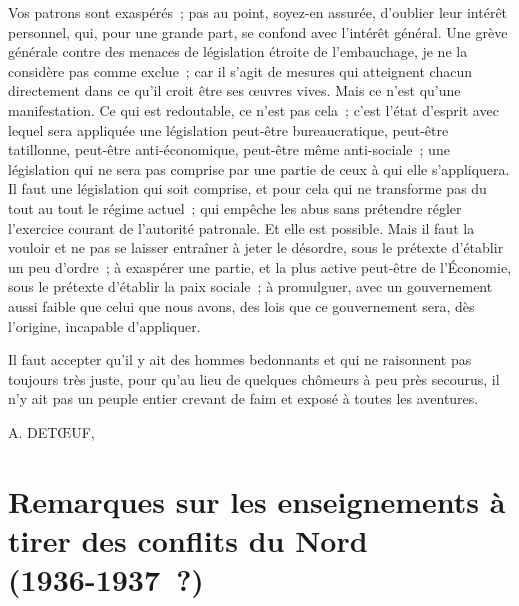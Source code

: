 \documentclass[french,twoside]{book} %
\begin{document}
Vos patrons sont exaspérés ; pas au point, soyez-en assurée, d'oublier leur intérêt personnel, qui, pour une grande part, se confond avec l'intérêt général. Une grève générale contre des menaces de législation étroite de l'embauchage, je ne la considère pas comme exclue ; car il s'agit de mesures qui atteignent chacun directement dans ce qu'il croit être ses œuvres vives. Mais ce n'est qu'une manifestation. Ce qui est redoutable, ce n'est pas cela ; c'est l'état d'esprit avec lequel sera appliquée une législation peut-être bureaucratique, peut-être tatillonne, peut-être anti-économique, peut-être même anti-sociale ; une législation qui ne sera pas comprise par une partie de ceux à qui elle s'appliquera. Il faut une législation qui soit comprise, et pour cela qui ne transforme pas du tout au tout le régime actuel ; qui empêche les abus sans prétendre régler l'exercice courant de l'autorité patronale. Et elle est possible. Mais il faut la vouloir et ne pas se laisser entraîner à jeter le désordre, sous le prétexte d'établir un peu d'ordre ; à exaspérer une partie, et la plus active peut-être de l'Économie, sous le prétexte d'établir la paix sociale ; à promulguer, avec un gouvernement aussi faible que celui que nous avons, des lois que ce gouvernement sera, dès l'origine, incapable d'appliquer.\par
Il faut accepter qu'il y ait des hommes bedonnants et qui ne raisonnent pas toujours très juste, pour qu'au lieu de quelques chômeurs à peu près secourus, il n'y ait pas un peuple entier crevant de faim et exposé à toutes les aventures.\par
A. DETŒUF,
\section[Remarques sur les enseignements à tirer des conflits du Nord  (1936-1937 ?)]{Remarques sur les enseignements à tirer des conflits du Nord \protect\footnotemark  \\
(1936-1937 ?)}\renewcommand{\leftmark}{Remarques sur les enseignements à tirer des conflits du Nord  \\
(1936-1937 ?)}

\noindent \par
\end{document}
